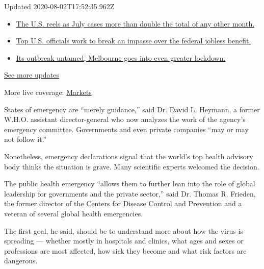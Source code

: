Updated 2020-08-02T17:52:35.962Z

\begin{itemize}
\tightlist
\item
  \href{https://www.nytimes.com/2020/08/01/world/coronavirus-covid-19.html?action=click\&pgtype=Article\&state=default\&region=MAIN_CONTENT_1\&context=storylines_live_updates\#link-34047410}{The
  U.S. reels as July cases more than double the total of any other
  month.}
\item
  \href{https://www.nytimes.com/2020/08/01/world/coronavirus-covid-19.html?action=click\&pgtype=Article\&state=default\&region=MAIN_CONTENT_1\&context=storylines_live_updates\#link-780ec966}{Top
  U.S. officials work to break an impasse over the federal jobless
  benefit.}
\item
  \href{https://www.nytimes.com/2020/08/01/world/coronavirus-covid-19.html?action=click\&pgtype=Article\&state=default\&region=MAIN_CONTENT_1\&context=storylines_live_updates\#link-2bc8948}{Its
  outbreak untamed, Melbourne goes into even greater lockdown.}
\end{itemize}

\href{https://www.nytimes.com/2020/08/01/world/coronavirus-covid-19.html?action=click\&pgtype=Article\&state=default\&region=MAIN_CONTENT_1\&context=storylines_live_updates}{See
more updates}

More live coverage:
\href{https://www.nytimes.com/live/2020/07/31/business/stock-market-today-coronavirus?action=click\&pgtype=Article\&state=default\&region=MAIN_CONTENT_1\&context=storylines_live_updates}{Markets}

States of emergency are ``merely guidance,'' said Dr. David L. Heymann,
a former W.H.O. assistant director-general who now analyzes the work of
the agency's emergency committee. Governments and even private companies
``may or may not follow it.''

Nonetheless, emergency declarations signal that the world's top health
advisory body thinks the situation is grave. Many scientific experts
welcomed the decision.

The public health emergency ``allows them to further lean into the role
of global leadership for governments and the private sector,'' said Dr.
Thomas R. Frieden, the former director of the Centers for Disease
Control and Prevention and a veteran of several global health
emergencies.

The first goal, he said, should be to understand more about how the
virus is spreading --- whether mostly in hospitals and clinics, what
ages and sexes or professions are most affected, how sick they become
and what risk factors are dangerous.

